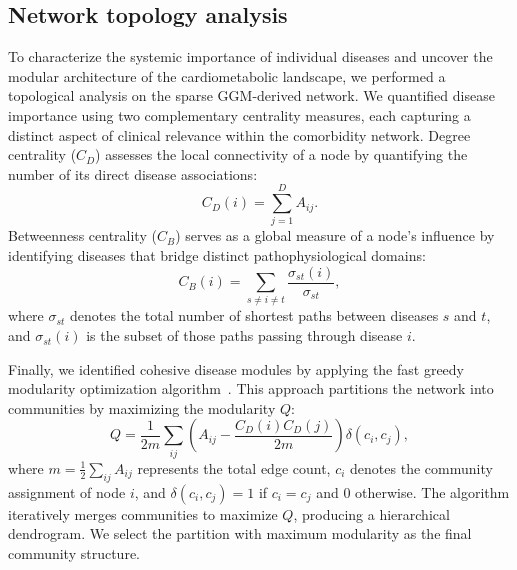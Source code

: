 \subsection{Network topology analysis}\label{subsec:topology}
To characterize the systemic importance of individual diseases and uncover the modular architecture of the cardiometabolic landscape, we performed a topological analysis on the sparse GGM-derived network. We quantified disease importance using two complementary centrality measures, each capturing a distinct aspect of clinical relevance within the comorbidity network. Degree centrality ($C_D$) assesses the local connectivity of a node by quantifying the number of its direct disease associations:
\begin{equation}
C_D(i) = \sum_{j=1}^D A_{ij}.
\end{equation}
Betweenness centrality ($C_B$) serves as a global measure of a node's influence by identifying diseases that bridge distinct pathophysiological domains:
\begin{equation}
C_B(i) = \sum_{s \neq i \neq t} \frac{\sigma_{st}(i)}{\sigma_{st}},
\end{equation}
where $\sigma_{st}$ denotes the total number of shortest paths between diseases $s$ and $t$, and $\sigma_{st}(i)$ is the subset of those paths passing through disease $i$. 

Finally, we identified cohesive disease modules by applying the fast greedy modularity optimization algorithm~\citet{clauset2004finding}. This approach partitions the network into communities by maximizing the modularity $Q$:
\begin{equation}
Q = \frac{1}{2m} \sum_{ij} \left(A_{ij} - \frac{C_D(i) C_D(j)}{2m}\right) \delta(c_i, c_j),
\end{equation}
where $m = \frac{1}{2}\sum_{ij} A_{ij}$ represents the total edge count, $c_i$ denotes the community assignment of node $i$, and $\delta(c_i, c_j) = 1$ if $c_i = c_j$ and 0 otherwise. The algorithm iteratively merges communities to maximize $Q$, producing a hierarchical dendrogram. We select the partition with maximum modularity as the final community structure.